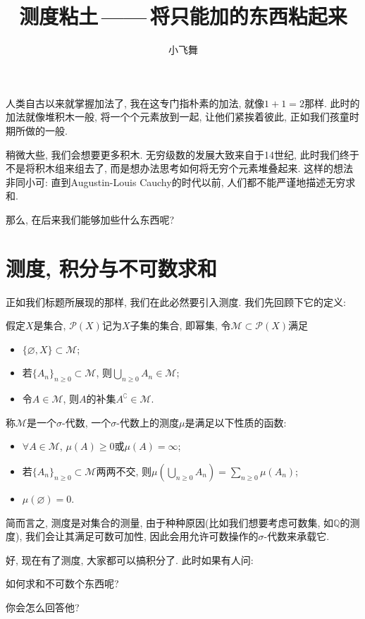 \documentclass{MeasureClay}
\title{\sffamily 测度粘土\,------\,将只能加的东西粘起来}
\author{小飞舞}
\date{\fontspec{lmsansquot8-regular.otf}\autodate}
\begin{document}
% 
\maketitle


人类自古以来就掌握加法了, 我在这专门指朴素的加法, 就像$1+1=2$那样. 此时的加法就像堆积木一般, 将一个个元素放到一起, 让他们紧挨着彼此, 正如我们孩童时期所做的一般.

稍微大些, 我们会想要更多积木. 无穷级数的发展大致来自于14世纪, 此时我们终于不是将积木组来组去了, 而是想办法思考如何将无穷个元素堆叠起来. 这样的想法非同小可: 直到Augustin-Louis Cauchy的时代以前, 人们都不能严谨地描述无穷求和.

那么, 在后来我们能够加些什么东西呢?

\section{测度, 积分与不可数求和}
正如我们标题所展现的那样, 我们在此必然要引入测度. 我们先回顾下它的定义:
\begin{defi}
    假定$X$是集合, $\mathcal P(X)$记为$X$子集的集合, 即幂集, 令$\mathcal M\subset \mathcal P(X)$满足
    \begin{itemize}
        \item $\{\varnothing,X\}\subset\mathcal M$;
        \item 若$\{A_n\}_{n\geqslant 0}\subset\mathcal M$, 则$\bigcup_{n\geqslant 0}A_n\in\mathcal M$;
        \item 令$A\in\mathcal M$, 则$A$的补集$A^\complement\in\mathcal M$.
    \end{itemize}
    称$\mathcal M$是一个$\sigma$-代数, 一个$\sigma$-代数上的测度$\mu$是满足以下性质的函数:
    \begin{itemize}
        \item $\forall A\in\mathcal M$, $\mu(A)\geqslant 0$或$\mu(A)=\infty$;
        \item 若$\{A_n\}_{n\geqslant 0}\subset\mathcal M$两两不交, 则$\mu(\bigcup_{n\geqslant 0}A_n)=\sum_{n\geqslant0}\mu(A_n)$;
        \item $\mu(\varnothing)=0$.
    \end{itemize}
\end{defi}
简而言之, 测度是对集合的测量, 由于种种原因(比如我们想要考虑可数集, 如$\mathbb Q$的测度), 我们会让其满足可数可加性, 因此会用允许可数操作的$\sigma$-代数来承载它.

好, 现在有了测度, 大家都可以搞积分了. 此时如果有人问:
\begin{center}
    \kaishu 如何求和不可数个东西呢?
\end{center}
你会怎么回答他?
\end{document}

